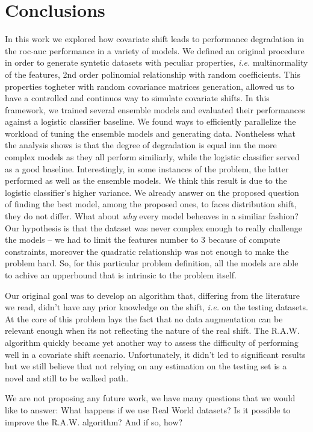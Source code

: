 \chapter*{Conclusions}

In this work we explored how covariate shift leads to performance degradation in the roc-auc performance in a variety of models. We defined an original procedure in order to generate syntetic datasets with peculiar properties, \textit{i.e.} multinormality of the features, 2nd order polinomial relationship with random coefficients. This properties togheter with random covariance matrices generation, allowed us to have a controlled and continuos way to simulate covariate shifts. In this framework, we trained several ensemble models and evaluated their performances against a logistic classifier baseline. We found ways to efficiently parallelize the workload of tuning the ensemble models and generating data. Nontheless what the analysis shows is that the degree of degradation is equal inn the more complex models as they all perform similiarly, while the logistic classifier served as a good baseline. Interestingly, in some instances of the problem, the latter performed as well as the ensemble models. We think this result is due to the logistic classifier's higher variance. We already answer on the proposed question of finding the best model, among the proposed ones, to faces distribution shift, they do not differ. What about \textit{why} every model beheaves in a similiar fashion? Our hypothesis is that the dataset was never complex enough to really challenge the models -- we had to limit the features number to 3 because of compute constraints, moreover the quadratic relationship was not enough to make the problem hard. So, for this particular problem definition, all the models are able to achive an {upperbound} that is intrinsic to the problem itself. 

Our original goal was to develop an algorithm that, differing from the literature we read, didn't have any prior knowledge on the shift, \textit{i.e.} on the testing datasets. At the core of this problem lays the fact that no data augmentation can be relevant enough when its not reflecting the nature of the real shift. The R.A.W. algorithm quickly became yet another way to assess the difficulty of performing well in a covariate shift scenario. Unfortunately, it didn't led to significant results but we still believe that not relying on any estimation on the testing set is a novel and still to be walked path.

We are not proposing any future work, we have many questions that we would like to answer: What happens if we use Real World datasets? Is it possible to improve the R.A.W. algorithm? And if so, how?
